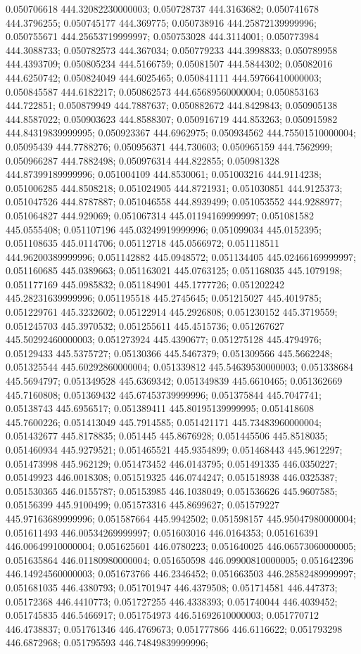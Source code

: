 0.050706618 444.32082230000003; 0.050728737 444.3163682; 0.050741678 444.3796255; 0.050745177 444.369775; 0.050738916 444.25872139999996; 0.050755671 444.25653719999997; 0.050753028 444.3114001; 0.050773984 444.3088733; 0.050782573 444.367034; 0.050779233 444.3998833; 0.050789958 444.4393709; 0.050805234 444.5166759; 0.05081507 444.5844302; 0.05082016 444.6250742; 0.050824049 444.6025465; 0.050841111 444.59766410000003; 0.050845587 444.6182217; 0.050862573 444.65689560000004; 0.050853163 444.722851; 0.050879949 444.7887637; 0.050882672 444.8429843; 0.050905138 444.8587022; 0.050903623 444.8588307; 0.050916719 444.853263; 0.050915982 444.84319839999995; 0.050923367 444.6962975; 0.050934562 444.75501510000004; 0.05095439 444.7788276; 0.050956371 444.730603; 0.050965159 444.7562999; 0.050966287 444.7882498; 0.050976314 444.822855; 0.050981328 444.87399189999996; 0.051004109 444.8530061; 0.051003216 444.9114238; 0.051006285 444.8508218; 0.051024905 444.8721931; 0.051030851 444.9125373; 0.051047526 444.8787887; 0.051046558 444.8939499; 0.051053552 444.9288977; 0.051064827 444.929069; 0.051067314 445.01194169999997; 0.051081582 445.0555408; 0.051107196 445.03249919999996; 0.051099034 445.0152395; 0.051108635 445.0114706; 0.05112718 445.0566972; 0.051118511 444.96200389999996; 0.051142882 445.0948572; 0.051134405 445.02466169999997; 0.051160685 445.0389663; 0.051163021 445.0763125; 0.051168035 445.1079198; 0.051177169 445.0985832; 0.051184901 445.1777726; 0.051202242 445.28231639999996; 0.051195518 445.2745645; 0.051215027 445.4019785; 0.051229761 445.3232602; 0.05122914 445.2926808; 0.051230152 445.3719559; 0.051245703 445.3970532; 0.051255611 445.4515736; 0.051267627 445.50292460000003; 0.051273924 445.4390677; 0.051275128 445.4794976; 0.05129433 445.5375727; 0.05130366 445.5467379; 0.051309566 445.5662248; 0.051325544 445.60292860000004; 0.051339812 445.54639530000003; 0.051338684 445.5694797; 0.051349528 445.6369342; 0.051349839 445.6610465; 0.051362669 445.7160808; 0.051369432 445.67453739999996; 0.051375844 445.7047741; 0.05138743 445.6956517; 0.051389411 445.80195139999995; 0.051418608 445.7600226; 0.051413049 445.7914585; 0.051421171 445.73483960000004; 0.051432677 445.8178835; 0.051445 445.8676928; 0.051445506 445.8518035; 0.051460934 445.9279521; 0.051465521 445.9354899; 0.051468443 445.9612297; 0.051473998 445.962129; 0.051473452 446.0143795; 0.051491335 446.0350227; 0.05149923 446.0018308; 0.051519325 446.0744247; 0.051518938 446.0325387; 0.051530365 446.0155787; 0.05153985 446.1038049; 0.051536626 445.9607585; 0.05156399 445.9100499; 0.051573316 445.8699627; 0.051579227 445.97163689999996; 0.051587664 445.9942502; 0.051598157 445.95047980000004; 0.051611493 446.00534269999997; 0.051603016 446.0164353; 0.051616391 446.00649910000004; 0.051625601 446.0780223; 0.051640025 446.06573060000005; 0.051635864 446.01180980000004; 0.051650598 446.09900810000005; 0.051642396 446.14924560000003; 0.051673766 446.2346452; 0.051663503 446.28582489999997; 0.051681035 446.4380793; 0.051701947 446.4379508; 0.051714581 446.447373; 0.05172368 446.4410773; 0.051727255 446.4338393; 0.051740044 446.4039452; 0.051745835 446.5466917; 0.051754973 446.51692610000003; 0.051770712 446.4738837; 0.051761346 446.4769673; 0.051777866 446.6116622; 0.051793298 446.6872968; 0.051795593 446.74849839999996; 